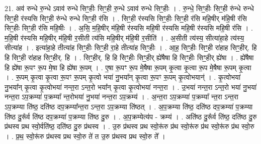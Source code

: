 \documentclass[17pt]{extarticle}
\begin{document}
21. अव॑ रुन्धे रु॒न्धे ऽवाव॑ रुन्धे सिꣳ॒॒हीः सिꣳ॒॒ही रु॒न्धे ऽवाव॑ रुन्धे सिꣳ॒॒हीः । . रु॒न्धे॒ सिꣳ॒॒हीः सिꣳ॒॒ही रु॑न्धे रुन्धे सिꣳ॒॒ही र॑स्यसि सिꣳ॒॒ही रु॑न्धे रुन्धे सिꣳ॒॒ही र॑सि । . सिꣳ॒॒ही र॑स्यसि सिꣳ॒॒हीः सिꣳ॒॒ही र॑सि महि॒षीर् म॑हि॒षी र॑सि सिꣳ॒॒हीः सिꣳ॒॒ही र॑सि महि॒षीः । . अ॒सि॒ म॒हि॒षीर् म॑हि॒षी र॑स्यसि महि॒षी र॑स्यसि महि॒षी र॑स्यसि महि॒षी र॑सि । . म॒हि॒षी र॑स्यसि महि॒षीर् म॑हि॒षी र॒सीती त्य॑सि महि॒षीर् म॑हि॒षी र॒सीति॑ । . अ॒सीती त्य॑स्य॒ सीत्या॑हा॒हे त्य॑स्य॒ सीत्या॑ह । . इत्या॑हा॒हे तीत्या॑ह सिꣳ॒॒हीः सिꣳ॒॒ही रा॒हे तीत्या॑ह सिꣳ॒॒हीः । . आ॒ह॒ सिꣳ॒॒हीः सिꣳ॒॒ही रा॑हाह सिꣳ॒॒हीर्. हि हि सिꣳ॒॒ही रा॑हाह सिꣳ॒॒हीर्. हि । . सिꣳ॒॒हीर्. हि हि सिꣳ॒॒हीः सिꣳ॒॒हीर् ह्ये॑षैषा हि सिꣳ॒॒हीः सिꣳ॒॒हीर् ह्ये॑षा । . ह्ये॑षैषा हि ह्ये॑षा रू॒पꣳ रू॒प मे॒षा हि ह्ये॑षा रू॒पम् । . ए॒षा रू॒पꣳ रू॒प मे॒षैषा रू॒पम् कृ॒त्वा कृ॒त्वा रू॒प मे॒षैषा रू॒पम् कृ॒त्वा । . रू॒पम् कृ॒त्वा कृ॒त्वा रू॒पꣳ रू॒पम् कृ॒त्वो भया॑ नु॒भया᳚न् कृ॒त्वा रू॒पꣳ रू॒पम् कृ॒त्वोभयान्॑ । . कृ॒त्वोभया॑ नु॒भया᳚न् कृ॒त्वा कृ॒त्वोभया॑ नन्त॒रा ऽन्त॒रो भया᳚न् कृ॒त्वा कृ॒त्वोभया॑ नन्त॒रा । . उ॒भया॑ नन्त॒रा ऽन्त॒रो भया॑ नु॒भया॑ नन्त॒रा ऽप॒क्रम्या॑ प॒क्रम्या᳚ न्त॒रोभया॑ नु॒भया॑ नन्त॒रा ऽप॒क्रम्य॑ । . अ॒न्त॒रा ऽप॒क्रम्या॑ प॒क्रम्या᳚ न्त॒रा ऽन्त॒रा ऽप॒क्रम्या ति॑ष्ठ॒ दति॑ष्ठ दप॒क्रम्या᳚न्त॒रा ऽन्त॒रा ऽप॒क्रम्या ति॑ष्ठत् । . अ॒प॒क्रम्या ति॑ष्ठ॒ दति॑ष्ठ दप॒क्रम्या॑ प॒क्रम्या ति॑ष्ठ दु॒रू᳚र्व ति॑ष्ठ दप॒क्रम्या॑ प॒क्रम्या ति॑ष्ठ दु॒रु । . अ॒प॒क्रम्येत्य॑प - क्रम्य॑ । . अति॑ष्ठ दु॒रू᳚र्व ति॑ष्ठ॒ दति॑ष्ठ दु॒रु प्र॑थस्व प्रथ स्वो॒र्वति॑ष्ठ॒ दति॑ष्ठ दु॒रु प्र॑थस्व । . उ॒रु प्र॑थस्व प्रथ स्वो॒रू॑रु प्र॑थ स्वो॒रू॑रु प्र॑थ स्वो॒रू॑रु प्र॑थ स्वो॒रु । . प्र॒थ॒ स्वो॒रू॑रु प्र॑थस्व प्रथ स्वो॒रु ते॑ त उ॒रु प्र॑थस्व प्रथ स्वो॒रु ते᳚ । \newline
\end{document}
